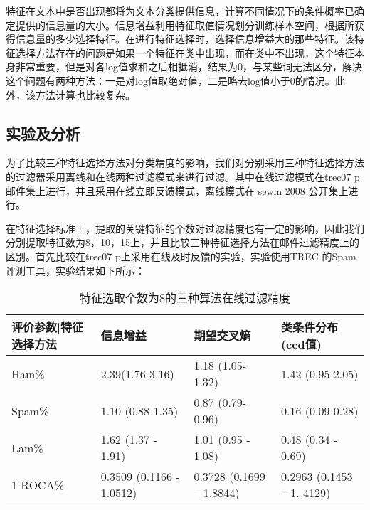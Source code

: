 特征在文本中是否出现都将为文本分类提供信息，计算不同情况下的条件概率已确定提供的信息量的大小。信息增益利用特征取值情况划分训练样本空间，根据所获得信息量的多少选择特征。在进行特征选择时，选择信息增益大的那些特征。该特征选择方法存在的问题是如果一个特征在类中出现，而在类中不出现，这个特征本身非常重要，但是对各log值求和之后相抵消，结果为0，与某些词无法区分，解决这个问题有两种方法：一是对log值取绝对值，二是略去log值小于0的情况。此外，该方法计算也比较复杂。

\subsection{实验及分析}
为了比较三种特征选择方法对分类精度的影响，我们对分别采用三种特征选择方法的过滤器采用离线和在线两种过滤模式来进行过滤。其中在线过滤模式在trec07 p 邮件集上进行，并且采用在线立即反馈模式，离线模式在 sewm 2008 公开集上进行。

在特征选择标准上，提取的关键特征的个数对过滤精度也有一定的影响，因此我们分别提取特征数为8，10，15上，并且比较三种特征选择方法在邮件过滤精度上的区别。首先比较在trec07 p上采用在线及时反馈的实验，实验使用TREC 的Spam 评测工具，实验结果如下所示：



\begin{table}[!htbp]
\centering
\begin{tabular}{|p{3cm}|p{3cm}|p{3cm}|p{3cm}|}%
\hline  %
评价参数|特征选择方法&信息增益&期望交叉熵&类条件分布(ccd值)\\
\hline  %
Ham\%&2.39(1.76-3.16)&1.18 (1.05-1.32)&1.42 (0.95-2.05)\\
\hline %
Spam\%&1.10 (0.88-1.35)&0.87 (0.79-0.96)&0.16 (0.09-0.28)\\
\hline %
Lam\%&1.62 (1.37 - 1.91)&1.01 (0.95 - 1.08)&0.48 (0.34 - 0.69)\\
\hline %
1-ROCA\%&0.3509 (0.1166 - 1.0512)&0.3728 (0.1699 – 1.8844)&0.2963 (0.1453 – 1.
4129)\\
\hline %
\end{tabular}
\caption{特征选取个数为8的三种算法在线过滤精度}
\end{table}


